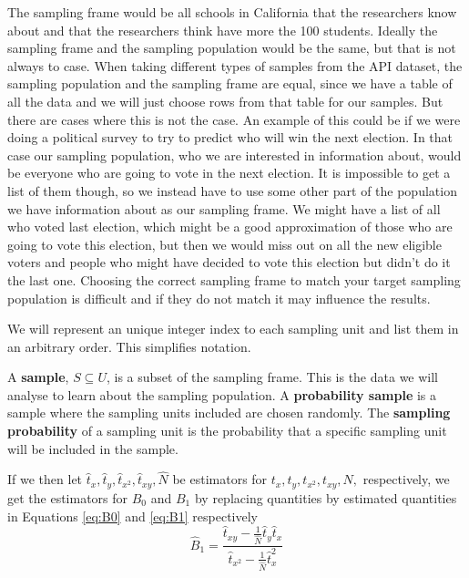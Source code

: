 \documentclass{article}
\begin{document}
The sampling frame would be all schools in California that the researchers know
about and that the researchers think have more the 100 students.
Ideally the sampling frame and the sampling population would be the same, but that is not always to case.
When taking different types of samples from the API dataset, the sampling population and the sampling frame are equal, since
we have a table of all the data and we will just choose rows from that table for
our samples. But there are cases where this is not the case. An example of this
could be if we were doing a political survey to try to predict who will win the
next election.
In that case our sampling population, who we are interested in information
about, would be everyone who are going to vote in the next election. It is
impossible to get a list of them though, so we instead have to use 
some other part of the population we have information about as our sampling frame. We might have a
list of all who voted last election, which might be a good approximation of
those who are going to vote this election, but then we would miss out on all the
new eligible voters and people who might have decided to vote this election but
didn't do it the last one.
Choosing the correct sampling frame to match your target sampling population is
difficult and if they do not match it may influence the results.

We will represent an unique integer index to each sampling unit and list them in an arbitrary order. This simplifies notation.


\begin{definition} \label{def:sample}
A \textbf{sample}, \(S \subseteq U\), is a subset of the sampling frame. This is the data we will analyse to learn about the sampling population.
A \textbf{probability sample} is a sample where the sampling units included are chosen randomly.
The \textbf{sampling probability} of a sampling unit is the probability that a
specific sampling unit will be included in the sample.
\end{definition}


If we then let \(\hat{t}_x, \hat{t}_y, \hat{t}_{x^2}, \hat{t}_{xy}, \hat{N}\) be estimators
for \(t_x, t_y, t_{x^2},
t_{xy}, N,\) respectively, we get the estimators for \(B_0\) and \(B_1\) by
replacing quantities by estimated quantities in Equations \ref{eq:B0} and
\ref{eq:B1} respectively
\begin{equation*}
 \hat{B}_1 = \frac{\hat{t}_{xy} - \frac{1}{\widehat{N}} \hat{t}_y \hat{t}_x}
   {\hat{t}_{x^2} - \frac{1}{\widehat{N}} \hat{t}_x^2}
\end{equation*}
\end{document}

